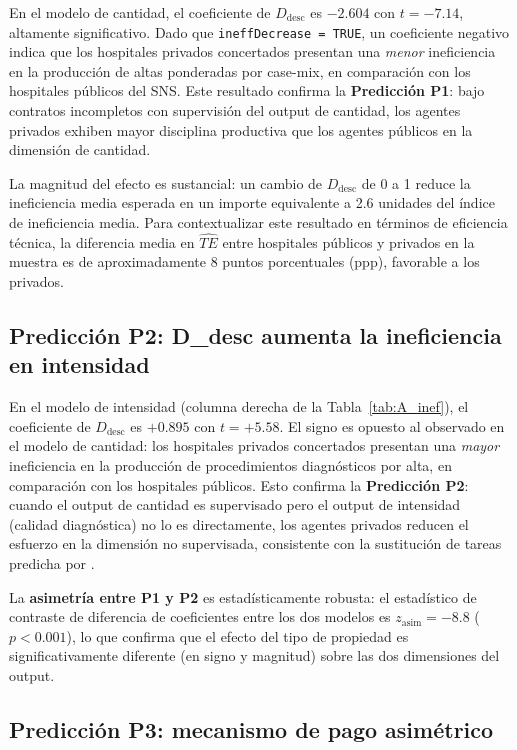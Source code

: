 En el modelo de cantidad, el coeficiente de \(D_{\text{desc}}\) es \(-2.604\) con $t = -7.14$, altamente significativo. Dado que \texttt{ineffDecrease = TRUE}, un coeficiente negativo indica que los hospitales privados concertados presentan una \emph{menor} ineficiencia en la producción de altas ponderadas por case-mix, en comparación con los hospitales públicos del SNS. Este resultado confirma la \textbf{Predicción P1}: bajo contratos incompletos con supervisión del output de cantidad, los agentes privados exhiben mayor disciplina productiva que los agentes públicos en la dimensión de cantidad.

La magnitud del efecto es sustancial: un cambio de $D_{\text{desc}}$ de 0 a 1 reduce la ineficiencia media esperada en un importe equivalente a 2.6 unidades del índice de ineficiencia media. Para contextualizar este resultado en términos de eficiencia técnica, la diferencia media en $\widehat{TE}$ entre hospitales públicos y privados en la muestra es de aproximadamente 8 puntos porcentuales (ppp), favorable a los privados.

\subsection{Predicción P2: D\_desc aumenta la ineficiencia en intensidad}
\label{subsec:P2}

En el modelo de intensidad (columna derecha de la Tabla~\ref{tab:A_inef}), el coeficiente de \(D_{\text{desc}}\) es \(+0.895\) con $t = +5.58$. El signo es opuesto al observado en el modelo de cantidad: los hospitales privados concertados presentan una \emph{mayor} ineficiencia en la producción de procedimientos diagnósticos por alta, en comparación con los hospitales públicos. Esto confirma la \textbf{Predicción P2}: cuando el output de cantidad es supervisado pero el output de intensidad (calidad diagnóstica) no lo es directamente, los agentes privados reducen el esfuerzo en la dimensión no supervisada, consistente con la sustitución de tareas predicha por \citet{holmstrom1991multitask}.

La \textbf{asimetría entre P1 y P2} es estadísticamente robusta: el estadístico de contraste de diferencia de coeficientes entre los dos modelos es $z_{\text{asim}} = -8.8$ ($p < 0.001$), lo que confirma que el efecto del tipo de propiedad es significativamente diferente (en signo y magnitud) sobre las dos dimensiones del output.

\subsection{Predicción P3: mecanismo de pago asimétrico}
\label{subsec:P3}

